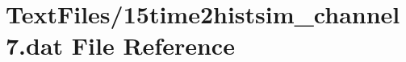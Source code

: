 \hypertarget{15time2histsim__channel7_8dat}{}\section{Text\+Files/15time2histsim\+\_\+channel7.dat File Reference}
\label{15time2histsim__channel7_8dat}
